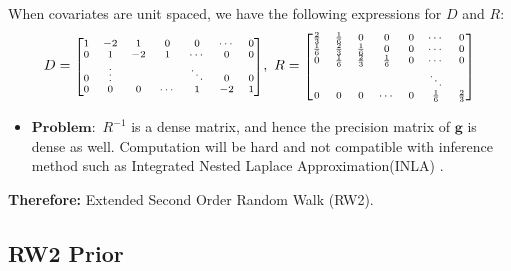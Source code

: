 \documentclass{beamer} %
\begin{document}
\begin{frame}
When covariates are unit spaced, we have the following expressions for $D$ and $R$:
\pause
\begin{equation}
\begin{aligned}
D = \mbox{\scriptsize $\begin{bmatrix}
1 & -2 & 1 & 0 & 0 & \cdots & 0\\
0 & 1 & -2 & 1 & \cdots & 0 & 0\\
0 & \vdots &  &  & \ddots & 0 & 0\\
0 & 0 & 0 & \cdots & 1 & -2 & 1\\
\end{bmatrix}$}, \ 
R = \mbox{\scriptsize $\begin{bmatrix}
\frac{2}{3} & \frac{1}{6} & 0 & 0 & 0 & \cdots & 0\\
\frac{1}{6} & \frac{2}{3} & \frac{1}{6} & 0 & 0 & \cdots & 0\\
0 & \frac{1}{6} & \frac{2}{3} & \frac{1}{6} & 0 & \cdots & 0\\
 &  &  &  &  & \ddots & \\
0 & 0 & 0 & \cdots & 0 & \frac{1}{6} & \frac{2}{3}\\
\end{bmatrix}$}
\end{aligned}
\end{equation}

\pause
\end{frame}



\begin{frame}

\begin{itemize}


\pause
\item $\textbf{Problem}:$ $R^{-1}$ is a dense matrix, and hence the precision matrix of $\boldsymbol{g}$ is dense as well. Computation will be hard and not compatible with inference method such as Integrated Nested Laplace Approximation(INLA) \citep{inla}.
\end{itemize}

\pause
\textbf{Therefore:} Extended Second Order Random Walk (RW2). 

\end{frame}



\subsection{RW2 Prior}
\end{document}
